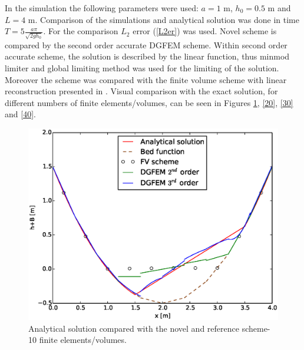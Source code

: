  In the simulation the following parameters were used: $a=1$ m, $h_0=0.5$ m and $L=4$ m. Comparison of the simulations and analytical solution was done in time  $T=5\frac{a\pi}{\sqrt{2gh_0}}$. For the comparison $L_2$ error (\ref{L2er}) was used. Novel scheme is compared by the second order accurate DGFEM scheme. Within second order accurate scheme, the solution is described by the linear function, thus minmod limiter and global limiting method was used for the limiting of the solution. Moreover the scheme was compared with the finite volume scheme with linear reconstruction presented in \cite{fiser2016}. Visual comparison with the exact solution, for different numbers of finite elements/volumes, can be seen in Figures \ref{10}, \ref{20}, \ref{30} and \ref{40}. 
				\begin{figure}[!ht]
								\centering
								 \begin{minipage}[t]{0.44\textwidth}
								    \begin{center}
								    \includegraphics[width=1.0\textwidth]{OBR/10.eps}
								    \caption{Analytical solution compared with the novel and reference scheme-10 finite elements/volumes.}\label{10}
								    \end{center}
								\end{minipage}\hspace{15mm}
								\begin{minipage}[t]{0.44\textwidth}
								    \begin{center}

\end{center}
\end{minipage}
\end{figure}
